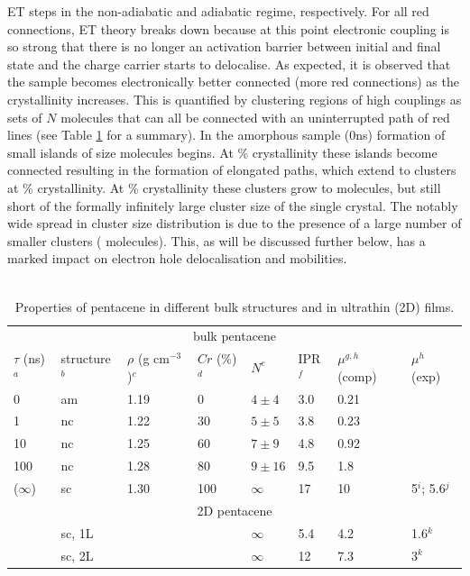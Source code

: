 ET steps in the non-adiabatic and adiabatic regime, respectively. For all red connections, ET theory breaks down because at this point electronic coupling is so strong 
that there is no longer an activation barrier between initial and final state and the charge carrier starts to delocalise\cite{C6FD00107F}. As expected, it is observed that  
the sample becomes electronically better connected (more red connections) as the crystallinity increases.  
This is quantified by clustering regions of high couplings as sets of $N$ molecules that can all be connected with an uninterrupted path of red lines (see Table \ref{tab:fragments} for a summary).
In the amorphous sample (0ns) formation of small islands of size  molecules begins. At \% crystallinity these islands become connected resulting in the formation of 
elongated  paths, which extend to  clusters at \% crystallinity. At \% crystallinity these clusters grow to  molecules, but still short of the formally infinitely 
large cluster size of the single crystal. The notably wide spread in cluster size distribution is due to the presence of a large number of smaller clusters ( molecules). 
This, as will be discussed further below, has a marked impact on electron hole delocalisation and mobilities. \\
\\
\begin{table}
 \caption{\label{tab:fragments}Properties of pentacene in different bulk structures and in ultrathin (2D) films.}
\begin{center}
  \begin{tabular}[htbp]{@{}llllllll@{}}
    \hline
     \multicolumn{8}{c}{bulk pentacene} \\
    $\tau$ (ns)$^a$ & structure$^b$ & $\rho$ (g cm$^{-3}$)$^c$ &  $Cr$ (\%)$^d$  &  $N^e$   & IPR$^f$  & $\mu^{g,h}$ (comp) & $\mu^h$ (exp) \\
    \hline
    0       & am & 1.19   & 0     & $4\pm4$      & 3.0 & 0.21 &       \\
    1       & nc & 1.22   & 30   & $5\pm5$      & 3.8	 & 0.23 &       \\
    10     & nc & 1.25   & 60   & $7\pm9$    & 4.8 & 0.92   &        \\
    100   & nc & 1.28  & 80   & $9\pm16$  & 9.5 & 1.8   &        \\
 ($\infty$) & sc &  1.30  & 100 & $\infty$           & 17 & 10 & 5$^i$; 5.6$^j$ \\
    \hline
    \multicolumn{8}{c}{2D pentacene} \\
             & sc, 1L &        &      &  $\infty$ &       5.4   &  4.2 & 1.6$^k$\\
             & sc, 2L &        &     &  $\infty$ &         12 & 7.3 & 3$^k$ \\
    \hline
  \end{tabular}
\end{center}
\end{table}
